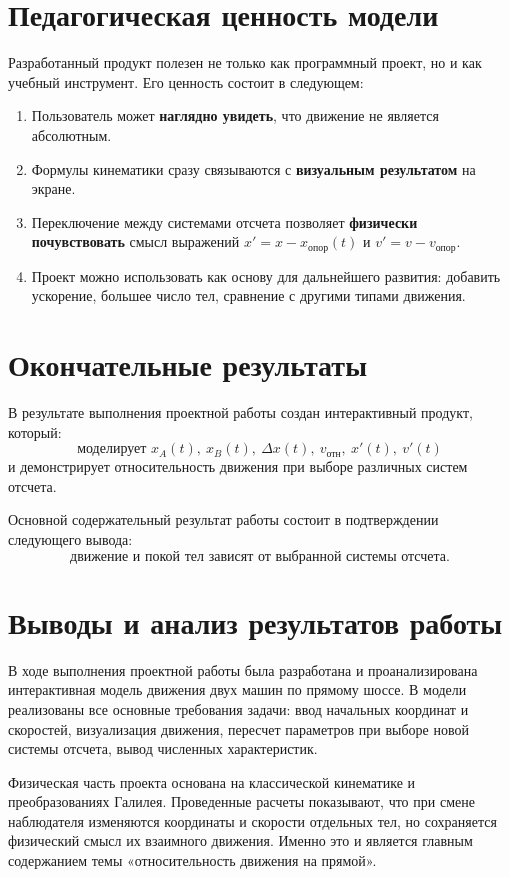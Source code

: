 \documentclass[12pt,a4paper]{article}
\begin{document}
\section{Педагогическая ценность модели}
Разработанный продукт полезен не только как программный проект, но и как учебный инструмент. Его ценность состоит в следующем:
\begin{enumerate}
    \item Пользователь может \textbf{наглядно увидеть}, что движение не является абсолютным.
    \item Формулы кинематики сразу связываются с \textbf{визуальным результатом} на экране.
    \item Переключение между системами отсчета позволяет \textbf{физически почувствовать} смысл выражений $x'=x-x_{\text{опор}}(t)$ и $v'=v-v_{\text{опор}}$.
    \item Проект можно использовать как основу для дальнейшего развития: добавить ускорение, большее число тел, сравнение с другими типами движения.
\end{enumerate}

\section{Окончательные результаты}
В результате выполнения проектной работы создан интерактивный продукт, который:
\[
\text{моделирует } x_A(t),\ x_B(t),\ \Delta x(t),\ v_{\text{отн}},\ x'(t),\ v'(t)
\]
и демонстрирует относительность движения при выборе различных систем отсчета.

Основной содержательный результат работы состоит в подтверждении следующего вывода:
\[
\text{движение и покой тел зависят от выбранной системы отсчета.}
\]

\section{Выводы и анализ результатов работы}
В ходе выполнения проектной работы была разработана и проанализирована интерактивная модель движения двух машин по прямому шоссе. В модели реализованы все основные требования задачи: ввод начальных координат и скоростей, визуализация движения, пересчет параметров при выборе новой системы отсчета, вывод численных характеристик.

Физическая часть проекта основана на классической кинематике и преобразованиях Галилея. Проведенные расчеты показывают, что при смене наблюдателя изменяются координаты и скорости отдельных тел, но сохраняется физический смысл их взаимного движения. Именно это и является главным содержанием темы «относительность движения на прямой».
\end{document}
